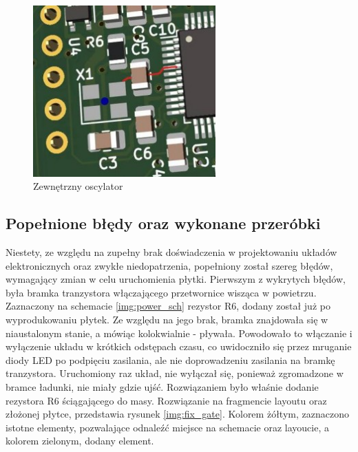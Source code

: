 \begin{figure}[H]
    \centering
    \includegraphics[width=7cm]{Graphics/emc_clock.jpg}
    \caption{Zewnętrzny oscylator}
    \label{img:emc_clock}
\end{figure}

\subsection{Popełnione błędy oraz wykonane przeróbki}
\label{sub:mistakes}
Niestety, ze względu na zupełny brak doświadczenia w projektowaniu układów elektronicznych oraz zwykłe niedopatrzenia, popełniony został szereg błędów, wymagający zmian w celu uruchomienia płytki.
\newline \newline
Pierwszym z wykrytych błędów, była bramka tranzystora włączającego przetwornice wisząca w powietrzu. Zaznaczony na schemacie \ref{img:power_sch} rezystor R6, dodany został już po wyprodukowaniu płytek. Ze względu na jego brak, bramka znajdowała się w niaustalonym stanie, a mówiąc kolokwialnie - pływała. Powodowało to włączanie i wyłączenie układu w krótkich odstępach czasu, co uwidoczniło się przez mruganie diody LED po podpięciu zasilania, ale nie doprowadzeniu zasilania na bramkę tranzystora. Uruchomiony raz układ, nie wyłączał się, ponieważ zgromadzone w bramce ładunki, nie miały gdzie ujść. Rozwiązaniem było właśnie dodanie rezystora R6 ściągającego do masy. Rozwiązanie na fragmencie layoutu oraz złożonej płytce, przedstawia rysunek \ref{img:fix_gate}. Kolorem żółtym, zaznaczono istotne elementy, pozwalające odnaleźć miejsce na schemacie oraz layoucie, a kolorem zielonym, dodany element.

